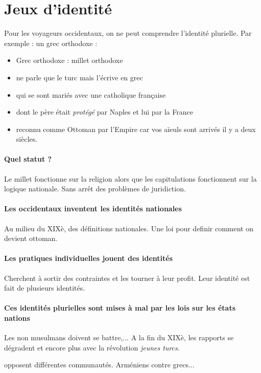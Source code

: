 \section{Jeux d'identité}

Pour les voyageurs occidentaux, on ne peut comprendre l'identité plurielle.
Par exemple : un grec orthodoxe : 
\begin{itemize}
    \item Grec orthodoxe : millet orthodoxe
    \item ne parle que le turc mais l'écrive en grec
    \item qui se sont mariés avec une catholique française
    \item dont le père était \textit{protégé} par Naples et lui par la France
    \item reconnu comme Ottoman par l'Empire car vos aïeuls sont arrivés il y a deux siècles. 
\end{itemize}
\paragraph{Quel statut ?}
 Le millet fonctionne sur la religion alors que les capitulations fonctionnent sur la logique nationale. Sans arrêt des problèmes de juridiction.

 \paragraph{Les occidentaux inventent les identités nationales}
 Au milieu du XIXè, des définitions nationales. Une loi pour definir comment on devient ottoman.

 \paragraph{Les pratiques individuelles jouent des identités} Cherchent à sortir des contraintes et les tourner à leur profit. Leur identité est fait de plusieurs identités. 

 \paragraph{Ces identités plurielles sont mises à mal par les lois sur les états nations} Les non musulmans doivent se battre,... A la fin du XIXè, les rapports se dégradent et encore plus avec la révolution \textit{jeunes turcs}. 
 \begin{Ex}
     opposent différentes communautés. Arméniens contre grecs...
 \end{Ex}

